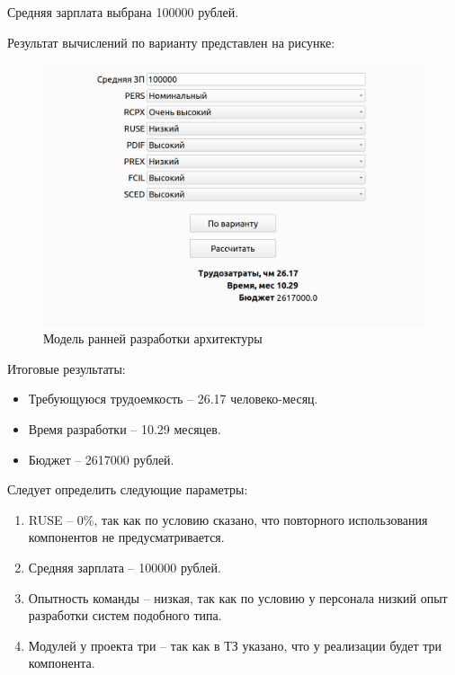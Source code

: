 Средняя зарплата выбрана 100000 рублей.

Результат вычислений по варианту представлен на рисунке:
\FloatBarrier
\begin{figure}[h]	
	\begin{center}
		\includegraphics[width=\linewidth]{inc/last.png}
	\end{center}
	\captionsetup{justification=centering}
	\caption{Модель ранней разработки архитектуры}
\end{figure}
\FloatBarrier 

Итоговые результаты:
\begin{itemize}
	\item Требующуюся трудоемкость -- 26.17 человеко-месяц.
	\item Время разработки -- 10.29 месяцев.
	\item Бюджет -- 2617000 рублей.
\end{itemize}

Следует определить следующие параметры: 
\begin{enumerate}
	\item RUSE -- 0\%, так как по условию сказано, что повторного использования компонентов не предусматривается.
	\item Средняя зарплата -- 100000 рублей.
	\item Опытность команды -- низкая, так как по условию у персонала низкий опыт разработки систем подобного типа.
	\item Модулей у проекта три -- так как в ТЗ указано, что у реализации будет три компонента.
\end{enumerate}

